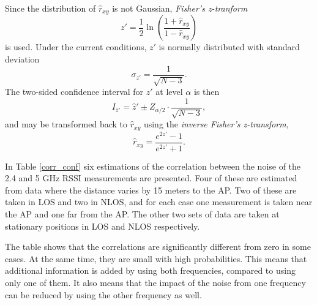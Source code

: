 \documentclass{LTHthesis}
\begin{document}
Since the distribution of $\hat r_{xy}$ is not Gaussian, \emph{Fisher's z-tranform}
%
\begin{equation}
z'=\frac{1}{2}\ln{\left(\frac{1+\hat r_{xy}}{1-\hat r_{xy}}\right)}
\end{equation}
%
is used. Under the current conditions, $ z'$ is normally distributed with standard deviation
%
\begin{equation}
\sigma_{z'}=\frac{1}{\sqrt{N-3}}.
\end{equation} 
%
The two-sided confidence interval for $z'$ at level $\alpha$ is then
%
\begin{equation}
I_{\hat z'} = \hat z' \pm Z_{\alpha/2}\cdot\frac{1}{\sqrt{N-3}}, 
\end{equation}
%
and may be transformed back to $\hat  r_{xy}$ using the \emph{inverse Fisher's z-transform},
%
\begin{equation}
\hat r_{xy}=\frac{e^{2z'}-1}{e^{2z'}+1}.
\end{equation}

In Table \ref{corr_conf} six estimations of the correlation between the noise of the 2.4 and 5 GHz RSSI measurements are presented. Four of these are estimated from data where the distance varies by 15 meters to the AP. Two of these are taken in LOS and two in NLOS, and for each case one measurement is taken near the AP and one far from the AP. The other two sets of data are taken at stationary positions in LOS and NLOS respectively.

The table shows that the correlations are significantly different from zero in some cases. At the same time, they are small with high probabilities. This means that additional information is added by using both frequencies, compared to using only one of them. It also means that the impact of the noise from one frequency can be reduced by using the other frequency as well.
\end{document}
